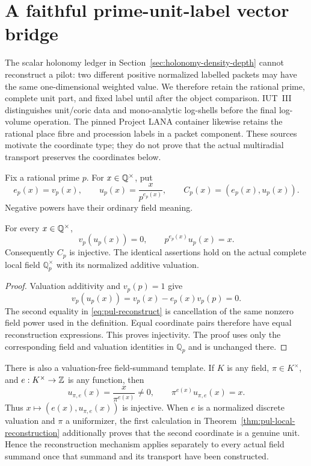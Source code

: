 \section{A faithful prime-unit-label vector bridge}
\label{sec:iut-prime-unit-label-vector}

The scalar holonomy ledger in Section~\ref{sec:holonomy-density-depth}
cannot reconstruct a pilot: two different positive normalized labelled
packets may have the same one-dimensional weighted value.  We therefore
retain the rational prime, complete unit part, and fixed label until after
the object comparison.  IUT~III \cite{IUT3} distinguishes unit/coric data and
mono-analytic log-shells before the final log-volume operation.  The pinned
Project LANA container \cite{LANA,LANAlean} likewise retains the rational
place fibre and procession labels in a packet component.  These sources
motivate the coordinate type; they do not prove that the actual multiradial
transport preserves the coordinates below.

Fix a rational prime $p$.  For $x\in\mathbb Q^\times$, put
\begin{equation}\label{eq:pul-coordinate}
 e_p(x)=v_p(x),\qquad
 u_p(x)=\frac{x}{p^{e_p(x)}},\qquad
 C_p(x)=(e_p(x),u_p(x)).
\end{equation}
Negative powers have their ordinary field meaning.

\begin{theorem}
\label{thm:pul-local-reconstruction}
For every $x\in\mathbb Q^\times$,
\begin{equation}\label{eq:pul-reconstruct}
 v_p(u_p(x))=0,\qquad p^{e_p(x)}u_p(x)=x.
\end{equation}
Consequently $C_p$ is injective.  The identical assertions hold on the
actual complete local field $\mathbb Q_p^\times$ with its normalized
additive valuation.
\end{theorem}

\begin{proof}
Valuation additivity and $v_p(p)=1$ give
\[
 v_p(u_p(x))=v_p(x)-e_p(x)v_p(p)=0.
\]
The second equality in \eqref{eq:pul-reconstruct} is cancellation of the
same nonzero field power used in the definition.  Equal coordinate pairs
therefore have equal reconstruction expressions.  This proves injectivity.
The proof uses only the corresponding field and valuation identities in
$\mathbb Q_p$ and is unchanged there.
\end{proof}

There is also a valuation-free field-summand template.  If $K$ is any field,
$\pi\in K^\times$, and $e:K^\times\to\mathbb Z$ is any function, then
\begin{equation}\label{eq:pul-field-scale}
 u_{\pi,e}(x)=\frac{x}{\pi^{e(x)}}\ne0,\qquad
 \pi^{e(x)}u_{\pi,e}(x)=x.
\end{equation}
Thus $x\mapsto(e(x),u_{\pi,e}(x))$ is injective.  When $e$ is a normalized
discrete valuation and $\pi$ a uniformizer, the first calculation in
Theorem~\ref{thm:pul-local-reconstruction} additionally proves that the
second coordinate is a genuine unit.  Hence the reconstruction mechanism
applies separately to every actual field summand once that summand and its
transport have been constructed.

